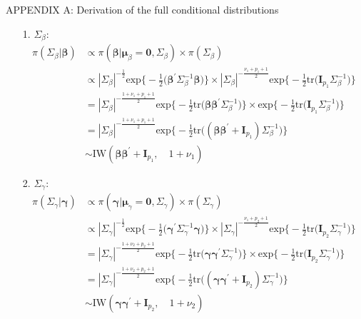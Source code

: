 \documentclass[a4paper, 12pt]{article}
\makeatletter
\renewcommand{\subsection}{\@startsection
	{subsection}    {2}    {0mm}    {-0.5\baselineskip}    {0.01\baselineskip}    {\normalfont\normalsize\itshape\center}}
\makeatother
\begin{document}
\subsection{APPENDIX A: Derivation of the full conditional distributions}
	\begin{itemize}
		\item [1.] $\Sigma_{\beta}$:
			\begin{equation*}
			\begin{aligned}
		\pi(\Sigma_{\beta}|\mathbf{\beta}) 	&\propto \pi(\mathbf{\beta}|\mathbf{\mu}_{\beta} = \mathbf{0}, \Sigma_{\beta}) \times \pi(\Sigma_{\beta}) \\
			&\propto |\Sigma_{\beta}|^{-\frac{1}{2}}\mbox{exp}\Big\{-\frac{1}{2}\Big(\mathbf{\beta}^\prime \Sigma_{\beta}^{-1}\mathbf{\beta}\Big)\Big\}\times |\Sigma_{\beta}|^{-\frac{\nu_1 + p_1 + 1}{2}}\mbox{exp}\Big\{-\frac{1}{2}\mbox{tr}\Big(\mathbf{I}_{p_1}\Sigma_{\beta}^{-1}\Big)\Big\}\\
			& = |\Sigma_{\beta}|^{-\frac{1 + \nu_1 + p_1 +1}{2}}\mbox{exp}\Big\{-\frac{1}{2}\mbox{tr}\Big(\mathbf{\beta}\mathbf{\beta}^\prime \Sigma_{\beta}^{-1}\Big)\Big\}\times \mbox{exp}\Big\{-\frac{1}{2}\mbox{tr}\Big(\mathbf{I}_{p_1}\Sigma_{\beta}^{-1}\Big)\Big\}\\
			& = |\Sigma_{\beta}|^{-\frac{1 + \nu_1 + p_1 +1}{2}}\mbox{exp}\Big\{-\frac{1}{2}\mbox{tr}\Big((\mathbf{\beta}\mathbf{\beta}^\prime + \mathbf{I}_{p_1})\Sigma_{\beta}^{-1}\Big) \Big\}\\
						&\sim \mbox{IW}(\mathbf{\beta}\mathbf{\beta}^\prime + \mathbf{I}_{p_1},\quad 1 + \nu_1)	
			\end{aligned}
			\end{equation*} 
				\item [2.] $\Sigma_{\gamma}$:
				\begin{equation*}
				\begin{aligned}
				\pi(\Sigma_{\gamma}|\mathbf{\gamma}) 	&\propto \pi(\mathbf{\gamma}|\mathbf{\mu}_{\gamma} = \mathbf{0}, \Sigma_{\gamma}) \times \pi(\Sigma_{\gamma}) \\
				&\propto |\Sigma_{\gamma}|^{-\frac{1}{2}}\mbox{exp}\Big\{-\frac{1}{2}\Big(\mathbf{\gamma}^\prime \Sigma_{\gamma}^{-1}\mathbf{\gamma}\Big)\Big\}\times |\Sigma_{\gamma}|^{-\frac{\nu_1 + p_2 + 1}{2}}\mbox{exp}\Big\{-\frac{1}{2}\mbox{tr}\Big(\mathbf{I}_{p_2}\Sigma_{\gamma}^{-1}\Big)\Big\}\\
				& = |\Sigma_{\gamma}|^{-\frac{1 + \nu_2 + p_2 +1}{2}}\mbox{exp}\Big\{-\frac{1}{2}\mbox{tr}\Big(\mathbf{\gamma}\mathbf{\gamma}^\prime \Sigma_{\gamma}^{-1}\Big)\Big\}\times \mbox{exp}\Big\{-\frac{1}{2}\mbox{tr}\Big(\mathbf{I}_{p_2}\Sigma_{\gamma}^{-1}\Big)\Big\}\\
				& = |\Sigma_{\gamma}|^{-\frac{1 + \nu_2 + p_2 +1}{2}}\mbox{exp}\Big\{-\frac{1}{2}\mbox{tr}\Big((\mathbf{\gamma}\mathbf{\gamma}^\prime + \mathbf{I}_{p_2})\Sigma_{\gamma}^{-1}\Big) \Big\}\\
				&\sim \mbox{IW}(\mathbf{\gamma}\mathbf{\gamma}^\prime + \mathbf{I}_{p_2},\quad 1 + \nu_2)	
				\end{aligned}
				\end{equation*}
	\end{itemize}
\end{document}
